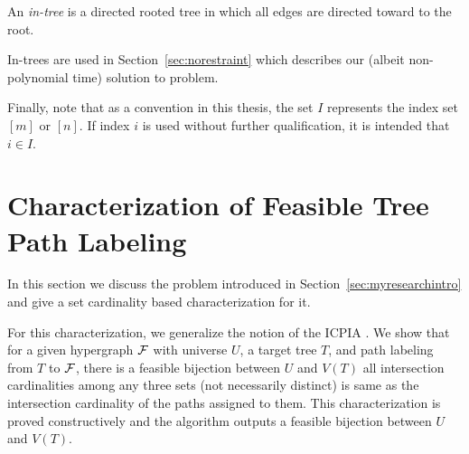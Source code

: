 

\begin{definition}[In-tree]
An {\em in-tree} is a directed rooted tree in which all edges are
directed toward to the root.  
\end{definition}
In-trees are used in Section~\ref{sec:norestraint} which describes our
(albeit non-polynomial time) solution to \CFTPL problem.

Finally, note that as a convention in this thesis, the set $I$
represents the index set $[m]$ or $[n]$. If index $i$ is used without further
qualification, it is intended that $i \in I$.

\section[Characterization of FTPL]{Characterization of Feasible Tree
  Path Labeling}
\label{sec:feasible}

In this section we discuss the \FTPL problem introduced in
Section~\ref{sec:myresearchintro} and give a set cardinality based
characterization for it.


For this characterization, we generalize the notion of the ICPIA
\cite{nsnrs09}.  We show that for a given hypergraph ${\cal F}$ with
universe $U$, a target tree $T$, and path labeling from $T$ to ${\cal F}$, there
is a feasible bijection between $U$ and $V(T)$ \iff all intersection
cardinalities among any three sets (not necessarily distinct) is same
as the intersection cardinality of the paths assigned to them.  This
characterization is proved constructively and the algorithm outputs a
feasible bijection between $U$ and $V(T)$.

